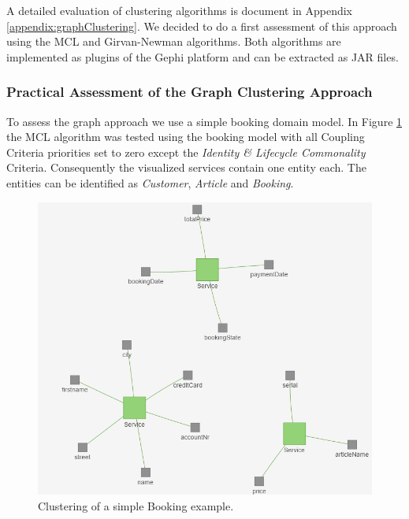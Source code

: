 A detailed evaluation of clustering algorithms is document in Appendix \ref{appendix:graphClustering}. We decided to do a first assessment of this approach using the MCL\cite{mcl} and Girvan-Newman\cite{girvanNewman} algorithms. Both algorithms are implemented as plugins of the Gephi\cite{gephi} platform and can be extracted as \gls{JAR} files.

\subsubsection{Practical Assessment of the Graph Clustering Approach}

To assess the graph approach we use a simple booking domain model. In Figure \ref{fig:clusteringBookingSimple} the MCL algorithm was tested using the booking model with all Coupling Criteria priorities set to zero except the \textit{Identity \& Lifecycle Commonality} Criteria. Consequently the visualized services contain one entity each. The entities can be identified as \textit{Customer}, \textit{Article} and \textit{Booking}.

\begin{figure}[H]
	\begin{center}
		\includegraphics[scale=0.8]{images/booking_entities.png}
	\end{center}
	\caption{Clustering of a simple Booking example.}
	\label{fig:clusteringBookingSimple}
\end{figure}


